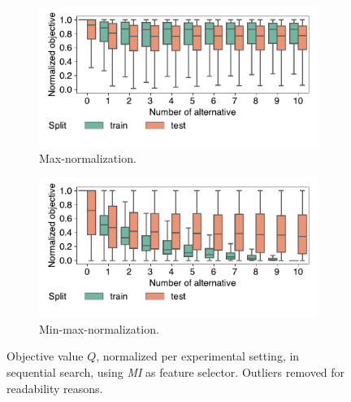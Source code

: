\documentclass{article}
\theoremstyle{definition}
\begin{document}
\begin{figure}[htb]
	\centering
	\begin{subfigure}{0.48\textwidth}
		\centering
		\includegraphics[width=\textwidth, trim=5 25 10 5, clip]{plots/impact-num-alternatives-objective-max.pdf}
		\caption{Max-normalization.}
		\label{fig:impact-num-alternatives-objective-max}
	\end{subfigure}
	\hfill
	\begin{subfigure}{0.48\textwidth}
		\centering
		\includegraphics[width=\textwidth, trim=5 25 10 5, clip]{plots/impact-num-alternatives-objective-min-max.pdf}
		\caption{Min-max-normalization.}
		\label{fig:impact-num-alternatives-objective-min-max}
	\end{subfigure}
	\caption{Objective value $Q$, normalized per experimental setting, in sequential search, using \emph{MI} as feature selector.
	Outliers removed for readability reasons.}
	\label{fig:impact-num-alternatives-objective}
\end{figure}
\end{document}
